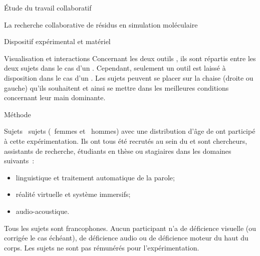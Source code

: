 \documentclass[myfrancais]{mythesis}
\begin{document}
\begin{mypart}{Étude du travail collaboratif}
\begin{mychapter}{La recherche collaborative de résidus en simulation moléculaire}
\begin{mysection}{Dispositif expérimental et matériel}
\begin{mysubsection}{Visualisation et interactions}
					Concernant les deux outils , ils sont répartis entre les deux sujets dans le cas d'un .
					Cependant, seulement un outil  est laissé à disposition dans le cas d'un .
					Les sujets peuvent se placer sur la chaise (droite ou gauche) qu'ils souhaitent et ainsi se mettre dans les meilleures conditions concernant leur main dominante.
				\end{mysubsection}
			\end{mysection}
			\begin{mysection}{Méthode}
				\begin{mysubsection}[sse-exp1-Sujets]{Sujets}
					~sujets (~femmes et ~hommes) avec une distribution d'âge de  ont participé à cette expérimentation.
					Ils ont tous été recrutés au sein du  et sont chercheurs, assistants de recherche, étudiants en thèse ou stagiaires dans les domaines suivants~:
					\begin{itemize}
						\item linguistique et traitement automatique de la parole;
						\item réalité virtuelle et système immersifs;
						\item audio-acoustique.
					\end{itemize}

					Tous les sujets sont francophones.
					Aucun participant n'a de déficience visuelle (ou corrigée le cas échéant), de déficience audio ou de déficience moteur du haut du corps.
					Les sujets ne sont pas rémunérés pour l'expérimentation.


\end{mysubsection}
\end{mysection}
\end{mychapter}
\end{mypart}
\end{document}
